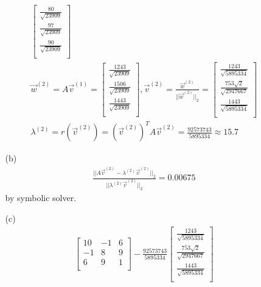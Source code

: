 \documentclass[12pt]{article}
\begin{document}
\begin{enumerate}[label=\bfseries Problem \arabic*:]
\begin{itemize}
\begin{align*}
        \begin{bmatrix}
            \frac{80}{\sqrt{23909}}\\
            \frac{97}{\sqrt{23909}}\\
            \frac{90}{\sqrt{23909}}\\
        \end{bmatrix}\\
        \vec{w}^{(2)}=A\vec{v}^{(1)}=
        \begin{bmatrix}
            \frac{1243}{\sqrt{23909}}\\
            \frac{1506}{\sqrt{23909}}\\
            \frac{1443}{\sqrt{23909}}\\
        \end{bmatrix}
        ,\vec{v}^{(2)}=\frac{\vec{w}^{(2)}}{||\vec{w}^{(2)}||_2}=
        \begin{bmatrix}
            \frac{1243}{\sqrt{5895334}}\\
            \frac{753\sqrt{2}}{\sqrt{2947667}}\\
            \frac{1443}{\sqrt{5895334}}\\
        \end{bmatrix}\\
        \lambda^{(2)}=r(\vec{v}^{(2)})=(\vec{v}^{(2)})^TA\vec{v}^{(2)}=\frac{92573743}{5895334}\approx15.7
        \end{align*}
        \item[(b)] \begin{align*}
            \frac{||A\vec{v}^{(2)}-\lambda^{(2)}\vec{v}^{(2)}||_2}{||\lambda^{(2)}\vec{v}^{(2)}||_2}=0.00675
        \end{align*}
        by symbolic solver.
        \item[(c)] \begin{align*}
            \begin{bmatrix}
                10 & -1 & 6\\
                -1 & 8 & 9\\
                6 & 9 & 1\\
            \end{bmatrix}
            -\frac{92573743}{5895334}
            \begin{bmatrix}
                \frac{1243}{\sqrt{5895334}}\\
                \frac{753\sqrt{2}}{\sqrt{2947667}}\\
                \frac{1443}{\sqrt{5895334}}\\
            \end{bmatrix}

\end{align*}
\end{itemize}
\end{enumerate}
\end{document}
